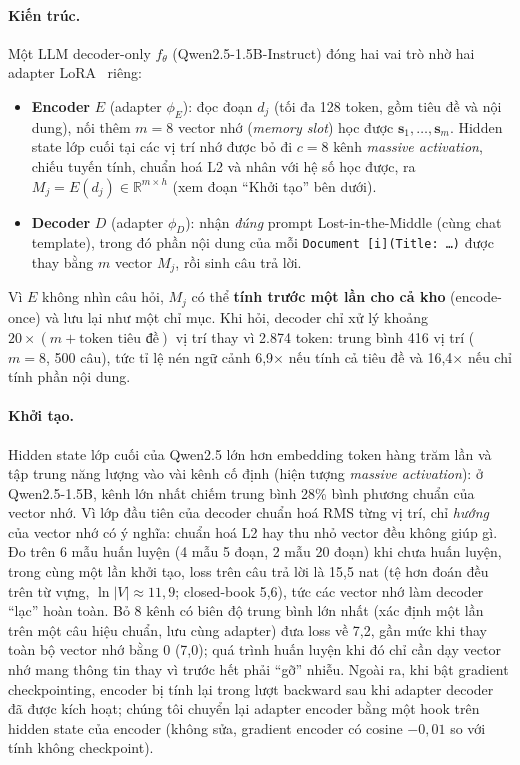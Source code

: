 \paragraph{Kiến trúc.} Một LLM decoder-only $f_\theta$ (Qwen2.5-1.5B-Instruct) đóng hai vai trò nhờ hai
adapter LoRA~\cite{hu2022lora} riêng:
\begin{itemize}
  \item \textbf{Encoder} $E$ (adapter $\phi_E$): đọc đoạn $d_j$ (tối đa 128 token, gồm tiêu đề và
  nội dung), nối thêm $m=8$ vector nhớ (\emph{memory slot}) học được $\mathbf{s}_1,\ldots,\mathbf{s}_m$. Hidden state lớp cuối tại các vị trí nhớ được bỏ đi $c=8$ kênh \emph{massive activation}, chiếu tuyến tính, chuẩn
  hoá L2 và nhân với hệ số học được, ra $M_j = E(d_j) \in \mathbb{R}^{m\times h}$ (xem đoạn
  ``Khởi tạo'' bên dưới).
  \item \textbf{Decoder} $D$ (adapter $\phi_D$): nhận \emph{đúng} prompt Lost-in-the-Middle (cùng
  chat template), trong đó phần nội dung của mỗi \texttt{Document [i](Title: \ldots)} được thay bằng
  $m$ vector $M_j$, rồi sinh câu trả lời.
\end{itemize}
Vì $E$ không nhìn câu hỏi, $M_j$ có thể \textbf{tính trước một lần cho cả kho} (encode-once) và
lưu lại như một chỉ mục. Khi hỏi, decoder chỉ xử lý khoảng $20\times(m+\text{token tiêu đề})$
vị trí thay vì 2.874 token: trung bình 416 vị trí ($m=8$, 500 câu), tức tỉ lệ nén ngữ cảnh
6,9$\times$ nếu tính cả tiêu đề và 16,4$\times$ nếu chỉ tính phần nội dung.

\paragraph{Khởi tạo.} Hidden state lớp cuối của Qwen2.5 lớn hơn embedding token hàng trăm lần và tập
trung năng lượng vào vài kênh cố định (hiện tượng \emph{massive activation}): ở Qwen2.5-1.5B, kênh lớn
nhất chiếm trung bình 28\% bình phương chuẩn của vector nhớ. Vì lớp đầu tiên của decoder chuẩn hoá
RMS từng vị trí, chỉ \emph{hướng} của vector nhớ có ý nghĩa: chuẩn hoá L2 hay thu nhỏ vector đều không
giúp gì. Đo trên 6 mẫu huấn luyện (4 mẫu 5 đoạn, 2 mẫu 20 đoạn) khi chưa huấn luyện, trong cùng một
lần khởi tạo, loss trên câu trả lời là 15,5 nat (tệ hơn đoán
đều trên từ vựng, $\ln|V|\approx 11{,}9$; closed-book 5,6), tức các vector nhớ làm decoder ``lạc''
hoàn toàn. Bỏ 8 kênh có biên độ trung bình lớn nhất (xác định một lần trên một câu hiệu chuẩn, lưu
cùng adapter) đưa loss về 7,2, gần mức khi thay toàn bộ vector nhớ bằng 0 (7,0); quá trình huấn luyện
khi đó chỉ cần dạy vector nhớ mang thông tin thay vì trước hết phải ``gỡ'' nhiễu. Ngoài ra, khi bật
gradient checkpointing, encoder bị tính lại trong lượt backward sau khi adapter decoder đã được
kích hoạt; chúng tôi chuyển lại adapter encoder bằng một hook trên hidden state của encoder (không
sửa, gradient encoder có cosine $-0{,}01$ so với tính không checkpoint).

